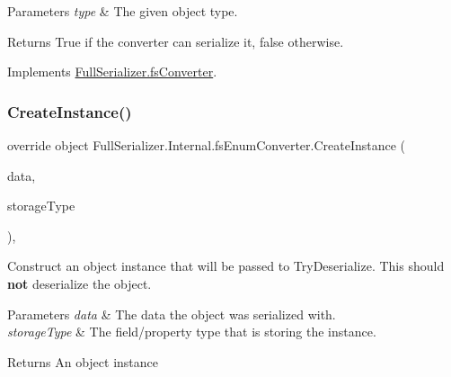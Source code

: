 \begin{DoxyParams}{Parameters}
{\em type} & The given object type.\\
\hline
\end{DoxyParams}
\begin{DoxyReturn}{Returns}
True if the converter can serialize it, false otherwise.
\end{DoxyReturn}


Implements \hyperlink{class_full_serializer_1_1fs_converter_a6d9e084c5e7f646a8d220705efaecb35}{Full\+Serializer.\+fs\+Converter}.

\mbox{\label{class_full_serializer_1_1_internal_1_1fs_enum_converter_a1d20e736fc995f6d127a312ae19f55b2}} 
\subsubsection{\texorpdfstring{Create\+Instance()}{CreateInstance()}}
{\footnotesize\ttfamily override object Full\+Serializer.\+Internal.\+fs\+Enum\+Converter.\+Create\+Instance (\begin{DoxyParamCaption}\item[{\hyperlink{class_full_serializer_1_1fs_data}{fs\+Data}}]{data,  }\item[{Type}]{storage\+Type }\end{DoxyParamCaption})\hspace{0.3cm}{\ttfamily [inline]}, {\ttfamily [virtual]}}



Construct an object instance that will be passed to Try\+Deserialize. This should {\bfseries not} deserialize the object. 


\begin{DoxyParams}{Parameters}
{\em data} & The data the object was serialized with.\\
\hline
{\em storage\+Type} & The field/property type that is storing the instance.\\
\hline
\end{DoxyParams}
\begin{DoxyReturn}{Returns}
An object instance
\end{DoxyReturn}


